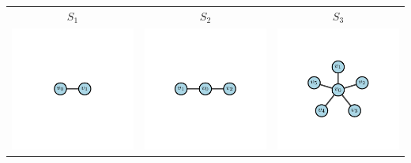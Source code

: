         \begin{table}[H]
            \begin{center}
                \begin{tabular}{ccc}
                
                    \textbf{$S_1$} & \textbf{$S_2$} & \textbf{$S_3$} \\
                    \includegraphics{Sections/Graphs/GraphsImages/GraphsSn/S1.pdf}
                    \centering 
                    &
                    \includegraphics{Sections/Graphs/GraphsImages/GraphsSn/S2.pdf}
                    &
                    \includegraphics{Sections/Graphs/GraphsImages/GraphsSn/S5.pdf}

\end{tabular}
\end{center}
\end{table}
